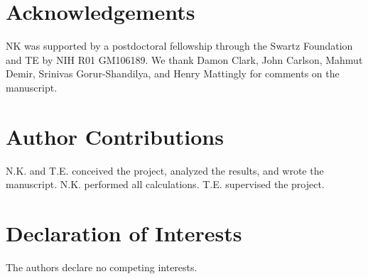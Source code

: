 \documentclass[10pt,prl,aps,showpacs,twocolumn,unsortedaddress]{revtex4-1}
\begin{document}
\section*{Acknowledgements}

NK was supported by a postdoctoral fellowship through the Swartz Foundation and TE by NIH R01 GM106189. We thank Damon  Clark, John Carlson, Mahmut Demir, Srinivas Gorur-Shandilya, and Henry Mattingly for comments on the manuscript.

\section*{Author Contributions}
N.K. and T.E. conceived the project, analyzed the results, and wrote the manuscript. N.K. performed all calculations. T.E. supervised the project.

\section*{Declaration of Interests}
The authors declare no competing interests.




\end{document}
